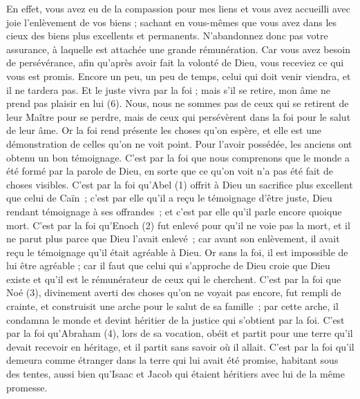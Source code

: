 \begin{multicols}{2}
En effet, vous avez eu de la compassion pour mes liens et vous avez accueilli avec joie l'enlèvement de vos biens ; sachant en vous-mêmes que vous avez dans les cieux des biens plus excellents et permanents.
N’abandonnez donc pas votre assurance, à laquelle est attachée une grande rémunération.
Car vous avez besoin de persévérance, afin qu'après avoir fait la volonté de Dieu, vous receviez ce qui vous est promis.
Encore un peu, un peu de temps, celui qui doit venir viendra, et il ne tardera pas.
Et le juste vivra par la foi ; mais s’il se retire, mon âme ne prend pas plaisir en lui (6).
Nous, nous ne sommes pas de ceux qui se retirent de leur Maître pour se perdre, mais de ceux qui persévèrent dans la foi pour le salut de leur âme.
\VerseOne{}Or la foi rend présente les choses qu'on espère, et elle est une démonstration de celles qu'on ne voit point.
Pour l’avoir possédée, les anciens ont obtenu un bon témoignage.
C’est par la foi que nous comprenons que le monde a été formé par la parole de Dieu, en sorte que ce qu’on voit n’a pas été fait de choses visibles.
C’est par la foi qu’Abel (1) offrit à Dieu un sacrifice plus excellent que celui de Caïn ; c’est par elle qu’il a reçu le témoignage d’être juste, Dieu rendant témoignage à ses offrandes ; et c’est par elle qu’il parle encore quoique mort.
\TextTitle{[b. Hénoc]}
C’est par la foi qu’Enoch (2) fut enlevé pour qu’il ne voie pas la mort, et il ne parut plus parce que Dieu l’avait enlevé ; car avant son enlèvement, il avait reçu le témoignage qu’il était agréable à Dieu.
Or sans la foi, il est impossible de lui être agréable ; car il faut que celui qui s’approche de Dieu croie que Dieu existe et qu'il est le rémunérateur de ceux qui le cherchent.
\TextTitle{[c. Noé]}
C’est par la foi que Noé (3), divinement averti des choses qu’on ne voyait pas encore, fut rempli de crainte, et construisit une arche pour le salut de sa famille ; par cette arche, il condamna le monde et devint héritier de la justice qui s’obtient par la foi.
C’est par la foi qu’Abraham (4), lors de sa vocation, obéit et partit pour une terre qu'il devait recevoir en héritage, et il partit sans savoir où il allait.
C’est par la foi qu’il demeura comme étranger dans la terre qui lui avait été promise, habitant sous des tentes, aussi bien qu’Isaac et Jacob qui étaient héritiers avec lui de la même promesse.

\end{multicols}
